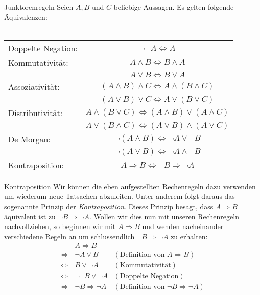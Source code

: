 \begin{lemma}{Junktorenregeln}
    Seien $A,B$ und $C$ beliebige Aussagen. Es gelten folgende Äquivalenzen:\\ \\
    \begin{tabular}{lc}
        Doppelte Negation:  & $\neg\neg A\Leftrightarrow A$\\
        Kommutativität:     & $ A\wedge B\Leftrightarrow B\wedge A$\\
                            & $A\vee B\Leftrightarrow B\vee A$\\
        Assoziativität:     & $(A\wedge B)\wedge C\Leftrightarrow A\wedge (B\wedge C)$\\
                            & $(A\vee B)\vee C\Leftrightarrow A\vee (B\vee C)$\\
        Distributivität:    & $A\wedge (B\vee C)\Leftrightarrow (A\wedge B)\vee (A\wedge C)$\\
                            & $A\vee (B\wedge C)\Leftrightarrow (A\vee B)\wedge (A\vee C)$\\
        De Morgan:          & $\neg(A\wedge B)\Leftrightarrow\neg A\vee\neg B$\\
                            & $\neg(A\vee B)\Leftrightarrow \neg A\wedge\neg B$\\
        Kontraposition:     & $A\Rightarrow B\Leftrightarrow \neg B\Rightarrow \neg A$
    \end{tabular}
\end{lemma}

\begin{example}{Kontraposition}
    Wir können die eben aufgestellten Rechenregeln dazu verwenden um wiederum neue Tatsachen abzuleiten. Unter anderem folgt daraus das sogenannte Prinzip der \textit{Kontraposition}. Dieses Prinzip besagt, dass $A\Rightarrow B$ äquivalent ist zu $\neg B\Rightarrow\neg A$. Wollen wir dies nun mit unseren Rechenregeln nachvollziehen, so beginnen wir mit $A\Rightarrow B$ und wenden nacheinander verschiedene Regeln an um schlussendlich $\neg B\Rightarrow \neg A$ zu erhalten:
    \begin{align*}
                         &A\Rightarrow B\\
       \Leftrightarrow\, &\neg A\lor B                  &(\text{Definition von }A\Rightarrow B)\\
       \Leftrightarrow\, &B\lor \neg A                  &(\text{Kommutativität})\\
       \Leftrightarrow\, &\neg\neg B\lor\neg A          &(\text{Doppelte Negation})\\
       \Leftrightarrow\, &\neg B\Rightarrow \neg A      &(\text{Definition von }\neg B\Rightarrow\neg A)
    \end{align*}
\end{example}

